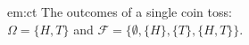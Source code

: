 



 \begin{exmp}{em:ct} The outcomes of a single coin toss:\\
 $\Omega = \{H,T\}$ and $\mathcal{F} = \{ \emptyset, \{H\}, \{T\}, \{H,T\}\}$.
 \end{exmp}

